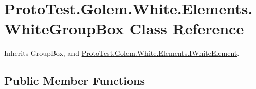 \hypertarget{class_proto_test_1_1_golem_1_1_white_1_1_elements_1_1_white_group_box}{\section{Proto\-Test.\-Golem.\-White.\-Elements.\-White\-Group\-Box Class Reference}
\label{class_proto_test_1_1_golem_1_1_white_1_1_elements_1_1_white_group_box}
}


Inherits Group\-Box, and \hyperlink{interface_proto_test_1_1_golem_1_1_white_1_1_elements_1_1_i_white_element}{Proto\-Test.\-Golem.\-White.\-Elements.\-I\-White\-Element}.

\subsection*{Public Member Functions}
